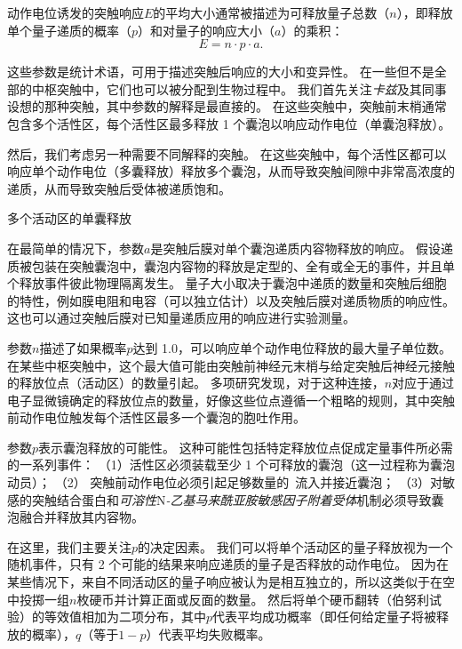 \begin{proposition}[突触强度取决于递质释放的概率和其他量子参数] \label{box:15_1}
	
	\quad \quad 动作电位诱发的突触响应$E$的平均大小通常被描述为可释放量子总数（$n$），即释放单个量子递质的概率（$p$）和对量子的响应大小（$a$）的乘积：
	\begin{equation}\label{eq:15_quantum_response}
		E = n \cdot p \cdot a.
	\end{equation}
	
	\quad \quad 这些参数是统计术语，可用于描述突触后响应的大小和变异性。
	在一些但不是全部的中枢突触中，它们也可以被分配到生物过程中。
	我们首先关注\textit{卡兹}及其同事设想的那种突触，其中参数的解释是最直接的。
	在这些突触中，突触前末梢通常包含多个活性区，每个活性区最多释放 1 个囊泡以响应动作电位（单囊泡释放）。
	
	\quad \quad 然后，我们考虑另一种需要不同解释的突触。
	在这些突触中，每个活性区都可以响应单个动作电位（多囊释放）释放多个囊泡，从而导致突触间隙中非常高浓度的递质，从而导致突触后受体被递质饱和。
	
	\quad \quad \textcolor[HTML]{00A652}{多个活动区的单囊释放}
	
	\quad \quad 在最简单的情况下，参数$a$是突触后膜对单个囊泡递质内容物释放的响应。
	假设递质被包装在突触囊泡中，囊泡内容物的释放是定型的、全有或全无的事件，并且单个释放事件彼此物理隔离发生。
	量子大小取决于囊泡中递质的数量和突触后细胞的特性，例如膜电阻和电容（可以独立估计）以及突触后膜对递质物质的响应性。
	这也可以通过突触后膜对已知量递质应用的响应进行实验测量。
	
	\quad \quad 参数$ n $描述了如果概率$ p $达到 1.0，可以响应单个动作电位释放的最大量子单位数。
	在某些中枢突触中，这个最大值可能由突触前神经元末梢与给定突触后神经元接触的释放位点（活动区）的数量引起。
	多项研究发现，对于这种连接，$ n $对应于通过电子显微镜确定的释放位点的数量，好像这些位点遵循一个粗略的规则，其中突触前动作电位触发每个活性区最多一个囊泡的胞吐作用。
	
	\quad \quad 参数$ p $表示囊泡释放的可能性。
	这种可能性包括特定释放位点促成定量事件所必需的一系列事件：
	（1）活性区必须装载至少 1 个可释放的囊泡（这一过程称为囊泡动员）；
	（2） 突触前动作电位必须引起足够数量的~流入并接近囊泡；
	（3）对敏感的突触结合蛋白和\textit{可溶性}N\textit{-乙基马来酰亚胺敏感因子附着受体}机制必须导致囊泡融合并释放其内容物。
	
	\quad \quad 在这里，我们主要关注$ p $的决定因素。
	我们可以将单个活动区的量子释放视为一个随机事件，只有 2 个可能的结果来响应递质的量子是否释放的动作电位。
	因为在某些情况下，来自不同活动区的量子响应被认为是相互独立的，所以这类似于在空中投掷一组$n$枚硬币并计算正面或反面的数量。
	然后将单个硬币翻转（伯努利试验）的等效值相加为二项分布，其中$ p $代表平均成功概率（即任何给定量子将被释放的概率），$ q $（等于$ 1-p $）代表平均失败概率。
	

\end{proposition}
